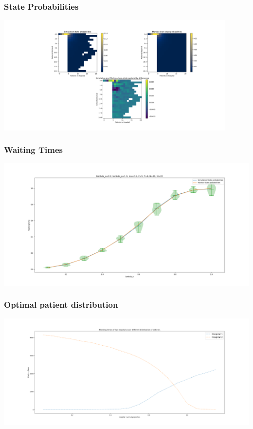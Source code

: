 \begin{frame}
    \frametitle{State Probabilities}
    \centering
    \includegraphics[trim=850 350 180 70, clip, width=0.9\textwidth]{Bin/src/heatmap.png}
\end{frame}


\begin{frame}
    \frametitle{Waiting Times}
    \centering
    \includegraphics[trim=110 50 110 60, clip, width=\textwidth]{Bin/src/waiting_times.png}
\end{frame}


\begin{frame}
    \frametitle{Optimal patient distribution}
    \centering
    \includegraphics[trim=158 45 150 70, clip, width=\textwidth]{Bin/src/optimal_patient.png}
\end{frame}

